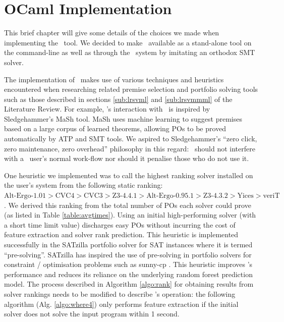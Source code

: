 \chapter{OCaml Implementation}
\thispagestyle{nohead}
\label{Implementation}

This brief chapter will give some details of the choices we made when implementing the \where~tool.
We decided to make \where~available as a stand-alone tool on the command-line as well as through the \why~system by imitating an orthodox SMT solver.   

The implementation of \where~makes use of various techniques and heuristics encountered when researching related premise selection and portfolio solving tools such as those described in sections \ref{sub:lrsvml} and \ref{sub:lrsvmmml} of the Literature Review.   
For example, \where's interaction with \why~is inspired by Sledgehammer's MaSh \cite{Sledgehammer} tool. MaSh uses machine learning to suggest premises based on a large corpus of learned theorems, allowing POs to be proved automatically by ATP and SMT tools. 
We aspired to Sledgehammer's ``zero click, zero maintenance, zero overhead'' philosophy in this regard: \where~should not interfere with a \why~user's normal work-flow nor should it penalise those who do not use it.

One heuristic we implemented was to call the highest ranking solver installed on the user's system from the following static ranking:
$ \text{Alt-Ergo-1.01} > \text{CVC4} > \text{CVC3} > \text{Z3-4.4.1} > \text{Alt-Ergo-0.95.1} > \text{Z3-4.3.2} > \text{Yices} > \text{veriT} $.
We derived this ranking from the total number of POs each solver could prove (as listed in Table \ref{table:avgtimes}).
Using an initial high-performing solver (with a short time limit value) discharges easy POs without incurring the cost of feature extraction and solver rank prediction.
This heuristic is implemented successfully in the SATzilla  \cite{SATzilla2012} portfolio solver for SAT instances where it is termed ``pre-solving''.
SATzilla has inspired the use of pre-solving in portfolio solvers for constraint / optimisation problems such as sunny-cp \cite{sunny-cp}.
This heuristic improves \where's performance and reduces its reliance on the underlying random forest prediction model. 
The process described in Algorithm \ref{algo:rank} for obtaining results from solver rankings needs to be modified to describe \where's operation:
the following algorithm (Alg. \ref{algo:where4}) only performs feature extraction if the initial solver does not solve the input program within 1 second. 

